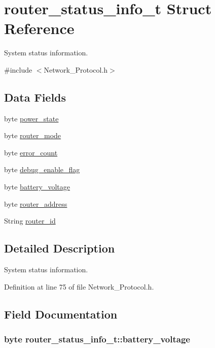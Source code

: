 \hypertarget{structrouter__status__info__t}{\section{router\-\_\-status\-\_\-info\-\_\-t Struct Reference}
\label{structrouter__status__info__t}
}


System status information.  




{\ttfamily \#include $<$Network\-\_\-\-Protocol.\-h$>$}

\subsection*{Data Fields}
\begin{DoxyCompactItemize}
\item 
byte \hyperlink{structrouter__status__info__t_a7040b5ae20fc707ba03db45c4e0b05cb}{power\-\_\-state}
\item 
byte \hyperlink{structrouter__status__info__t_a75039a32112b2b3380b93066999feb89}{router\-\_\-mode}
\item 
byte \hyperlink{structrouter__status__info__t_a63241fb3f686466e7846662512cba3da}{error\-\_\-count}
\item 
byte \hyperlink{structrouter__status__info__t_aeb0a188a81590d965000b8ba2d97222d}{debug\-\_\-enable\-\_\-flag}
\item 
byte \hyperlink{structrouter__status__info__t_a7ba3728fedf2b68d5cbee3cd3ea18110}{battery\-\_\-voltage}
\item 
byte \hyperlink{structrouter__status__info__t_a5826bd79b5649e794ea6b3b4594b854c}{router\-\_\-address}
\item 
String \hyperlink{structrouter__status__info__t_a95a30107734e8164920ce85290e40483}{router\-\_\-id}
\end{DoxyCompactItemize}


\subsection{Detailed Description}
System status information. 

Definition at line 75 of file Network\-\_\-\-Protocol.\-h.



\subsection{Field Documentation}
\hypertarget{structrouter__status__info__t_a7ba3728fedf2b68d5cbee3cd3ea18110}{
\subsubsection[{battery\-\_\-voltage}]{\setlength{\rightskip}{0pt plus 5cm}byte router\-\_\-status\-\_\-info\-\_\-t\-::battery\-\_\-voltage}}\label{structrouter__status__info__t_a7ba3728fedf2b68d5cbee3cd3ea18110}


